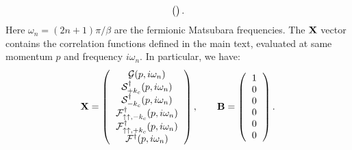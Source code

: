 \documentclass[pra,aps,superscriptaddress,twocolumn]{revtex4}
\begin{document}
\begin{widetext}
\begin{equation*}
\begin{pmatrix}
\begin{tabular}{  c c c c c c }
    \end{tabular}
  \end{pmatrix}.
\end{equation*}
Here $\omega_n=(2n+1)\pi/\beta$ are the fermionic Matsubara frequencies. The ${\bf X}$ vector contains
the correlation functions defined in the main text, evaluated at same momentum $p$ and frequency $i\omega_n$.
In particular, we have:
\begin{equation}
\mathbf{X}=
\begin{pmatrix}
\begin{tabular}{  c }
$\mathcal G (p,i\omega_n) $ \\
$\mathcal S^\dagger_{+k_c}  (p,i\omega_n) $\\
$\mathcal S^\dagger_{-k_c}  (p,i\omega_n)$ \\
$\mathcal F^\dagger_{\uparrow\uparrow,-k_c} (p,i\omega_n)$\\
$\mathcal F^\dagger_{\uparrow\uparrow,+k_c} (p,i\omega_n)$\\
$\mathcal F^\dagger (p,i\omega_n) $
\end{tabular}
\end{pmatrix}, \qquad
\mathbf{B}=\begin{pmatrix}
\begin{tabular}{  c }
 1  \\
0\\
0\\
0\\
0\\
0\end{tabular}
\end{pmatrix}.
\end{equation}


\end{widetext}
\end{document}
